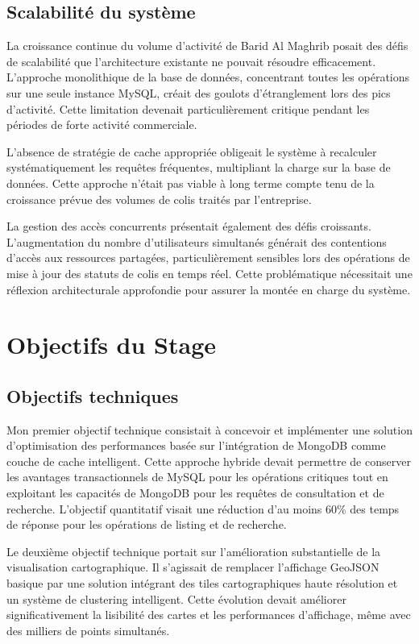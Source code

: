 \subsection{Scalabilité du système}

La croissance continue du volume d'activité de Barid Al Maghrib posait des défis de scalabilité que l'architecture existante ne pouvait résoudre efficacement. L'approche monolithique de la base de données, concentrant toutes les opérations sur une seule instance MySQL, créait des goulots d'étranglement lors des pics d'activité. Cette limitation devenait particulièrement critique pendant les périodes de forte activité commerciale.

L'absence de stratégie de cache appropriée obligeait le système à recalculer systématiquement les requêtes fréquentes, multipliant la charge sur la base de données. Cette approche n'était pas viable à long terme compte tenu de la croissance prévue des volumes de colis traités par l'entreprise.

La gestion des accès concurrents présentait également des défis croissants. L'augmentation du nombre d'utilisateurs simultanés générait des contentions d'accès aux ressources partagées, particulièrement sensibles lors des opérations de mise à jour des statuts de colis en temps réel. Cette problématique nécessitait une réflexion architecturale approfondie pour assurer la montée en charge du système.

\section{Objectifs du Stage}

\subsection{Objectifs techniques}

Mon premier objectif technique consistait à concevoir et implémenter une solution d'optimisation des performances basée sur l'intégration de MongoDB comme couche de cache intelligent. Cette approche hybride devait permettre de conserver les avantages transactionnels de MySQL pour les opérations critiques tout en exploitant les capacités de MongoDB pour les requêtes de consultation et de recherche. L'objectif quantitatif visait une réduction d'au moins 60\% des temps de réponse pour les opérations de listing et de recherche.

Le deuxième objectif technique portait sur l'amélioration substantielle de la visualisation cartographique. Il s'agissait de remplacer l'affichage GeoJSON basique par une solution intégrant des tiles cartographiques haute résolution et un système de clustering intelligent. Cette évolution devait améliorer significativement la lisibilité des cartes et les performances d'affichage, même avec des milliers de points simultanés.

